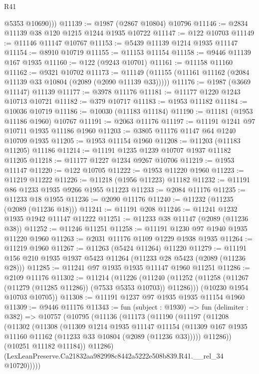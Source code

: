 \begin{lexlean}{R41}
\begin{coremodule}
          @5353
          @10690)))
@11139 := @1987 (@2867 @10804) @10796
@11146 := @2834 @11139 @38 @120 @1215 @1244 @1935 @10722
@11147 := @122 @10703
@11149 := @11146 @11147 @10767
@11153 := @5439 @11139 @1214 @1935 @11147
@11154 := @8910 @10719
@11155 := @11153 @11154
@11158 := @9446 @11139 @167 @1935
@11160 := @122 (@9243 @10701)
@11161 := @11158 @11160
@11162 := @9321 @10702
@11173 := @11149 (@11155 (@11161 @11162 (@2084 @11139 @33 @10804 (@2089 (@2090 @11139 @33)))))
@11176 := @1987 (@3669 @11147) @11139
@11177 := @3978 @11176
@11181 := @11177 @1220 @1243 @10713 @10721
@11182 := @379 @10717
@11183 := @1953 @11182
@11184 := @10036 @10719
@11186 := @10030 (@11183 @11184)
@11190 := @11181 (@1953 @11186 @1960) @10767
@11191 := @2063 @11176
@11197 := @11191 @1241 @97 @10711 @1935 @11186 @1960
@11203 := @3805 @11176 @1147 @64 @1240 @10709 @1935
@11205 := @1953 @11154 @1960
@11208 := @11203 (@11183 @11205) @11186
@11214 := @11191 @1235 @1239 @10707 @1937 @11182 @11205
@11218 := @11177 @1227 @1234 @9267 @10706
@11219 := @1953 @11147
@11220 := @122 @10705
@11222 := @1953 @11220 @1960
@11223 := @11219 @11222
@11226 := @11218 (@1956 @11223) @11182
@11232 := @11191 @86 @1233 @1935 @9266 @1955 @11223
@11233 := @2084 @11176
@11235 := @11233 @18 @1955
@11236 := @2090 @11176
@11240 := @11232 (@11235 (@2089 (@11236 @18)))
@11241 := @11191 @208
@11246 := @11241 @1232 @1935 @1942 @11147 @11222
@11251 := @11233 @38 @11147 (@2089 (@11236 @38))
@11252 := @11246 @11251
@11258 := @11191 @1230 @97 @1940 @1935 @11220 @1960
@11263 := @2031 @11176 @1109 @1229 @1938 @1935
@11264 := @11219 @1960
@11267 := @11263 (@5424 @11264) @11220
@11279 := @11191 @156 @210 @1935 @1937 @5423 @11264 (@11233 @28 @5423 (@2089 (@11236 @28)))
@11285 := @11241 @97 @1935 @1935 @11147 @1960 @11251
@11286 := @2109 @11176
@11302 := @11214
    (@11226
      (@11240 (@11252 (@11258 (@11267 (@11279 (@11285 @11286)) (@7533 @5353 @10703)) @11286)))
      (@10230 @1954 @10703 @10705))
@11308 := @11191 @1237 @97 @1935 @1935 @11154 @1960
@11309 := @9446 @11176
@11343 := fun (subject : @1930) =>
  fun (delimiter : @382) =>
  @10757
    (@10795
      (@11136
        (@11173
          (@11190
            (@11197
              (@11208
                (@11302
                  (@11308
                    (@11309
                      @1214
                      @1935
                      @11147
                      @11154
                      (@11309 @167 @1935 @11160 @11162 (@11233 @33 @10804 (@2089 (@11236 @33)))))
                    @11286))
                (@10251 @11182 @11184))
              @11286)
            (LexLeanPreserve.Ca21832aa982998c8442a5222e508b839.R41.__rel_34 @10720)))))

\end{coremodule}
\end{lexlean}
